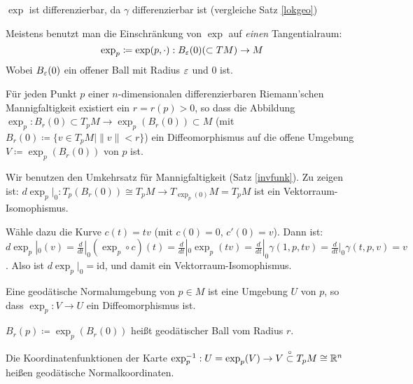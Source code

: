 \documentclass[a4paper,twoside,DIV15,BCOR12mm]{scrbook}
\newcommand{\otm}{\stackrel{\circ}{\subset}} %
\renewcommand{\da}{\coloneqq}
\begin{document}
\begin{bemerkungen}
\item $\exp$ ist differenzierbar, da $\gamma$ differenzierbar ist (vergleiche Satz \ref{lokgeo})
\item Meistens benutzt man die Einschränkung von $\exp$ auf \emph{einen} Tangentialraum:
\[
\exp_p \da \exp(p,\cdot): B_\ep(0) (\subset TM) \to M
\]
Wobei $B_\varepsilon(0)$ ein offener Ball mit Radius $\varepsilon$ und $0$ ist.
\end{bemerkungen}

\begin{satz}
Für jeden Punkt $p$ einer $n$-dimensionalen differenzierbaren Riemann’schen Mannigfaltigkeit existiert ein $r=r(p)>0$, so dass die Abbildung $\exp_p: B_r(0)\subset T_pM \to \exp_p(B_r(0)) \subset M$ (mit $B_r(0) \da \{v\in T_pM \mid \|v\|<r\}$) ein Diffeomorphismus auf die offene Umgebung $V\da \exp_p(B_r(0))$ von $p$ ist.
\end{satz}

\begin{beweis}
Wir benutzen den Umkehrsatz für Mannigfaltigkeit (Satz \ref{invfunk}). Zu zeigen ist: $d\exp_p|_0: T_p(B_r(0)) \cong T_pM \to T_{\exp_p(0)}M = T_pM$ ist ein Vektorraum-Isomophismus.

Wähle dazu die Kurve $c(t) = tv$ (mit $c(0)=0$, $c'(0)=v$). Dann ist: $d\exp_p|_0(v) = \frac d{dt}|_0 (\exp _p \circ c)(t) = \frac d{dt}|_0 \exp_p(tv) = \frac d{dt}|_0 \gamma(1,p,tv) = \frac d{dt}|_0 \gamma(t,p,v) = v$. Also ist $d\exp_p|_0 = \text{id}$, und damit ein Vektorraum-Isomophismus.
\end{beweis}

\begin{definition}
Eine geodätische Normalumgebung  von $p\in M$ ist eine Umgebung $U$ von $p$, so dass $\exp_p: V\to U$ ein Diffeomorphismus ist.

$B_r(p) \da \exp_p(B_r(0))$ heißt geodätischer Ball vom Radius $r$.

Die Koordinatenfunktionen der Karte $\exp_p^{-1} : U = \exp_p(V) \to V \otm T_pM \cong \MdR^n$ heißen geodätische Normalkoordinaten.
\end{definition}
\end{document}
